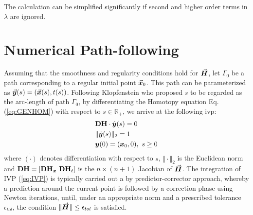 \begin{appendices}
The calculation can be simplified significantly if second and higher order 
terms in $\lambda$ are ignored.

\chapter{Numerical Path-following}\label{appendix:APPENDIX_E}

Assuming that the smoothness and regularity conditions hold for $\vec{\bm{H}}$, let
$\mathit{\Gamma}_0$ be a path corresponding to a regular initial point
$\vec{\bm{x}}_0$. This path can be parameterized as
$\vec{\bm{y}}(s)=(\vec{\bm{x}}(s),t(s))$. Following Klopfenstein\cite{Klopfenstein:1961}
who proposed $s$ to be regarded as the arc-length of path
$\mathit{\Gamma}_0$,
by differentiating the Homotopy equation Eq.
(\ref{eq:GENHOM})  with respect to $s\in\mathbb{R}_+$, we arrive at the 
following \acrshort{ivp}:
\begin{subequations}
	\begin{align}
		&\mathbf{DH}\cdot \dot{\bm{y}}(s) = 0\label{eq:IVP1_APP}\\
		&\Vert \dot{\bm{y}}(s)\Vert_2 = 1\label{eq:IVP2_AA}\\
		&\bm{y}(0) = (\bm{x}_0,0),\ s\geq 0\nonumber
	\end{align}
	\label{eq:IVP_APP}
\end{subequations}
\noindent where $\dot{(\cdot)}$ denotes differentiation with 
respect to $s$,  $\Vert \cdot\Vert_2$ is the Euclidean norm and
$\mathbf{DH}=[\mathbf{DH}_{\bm{x}}\ \mathbf{DH}_t]$ is the $n\times (n+1)$ 
Jacobian of $\vec{\bm{H}}$.
The integration of IVP (\ref{eq:IVP}) is typically carried out a by 
predictor-corrector approach, whereby a prediction around the current point 
is followed by a correction phase using Newton iterations, until, under an
appropriate norm and a prescribed tolerance $\epsilon_{tol}$, the condition
$\Vert \vec{\bm{H}}\Vert\leq \epsilon_{tol}$ is satisfied. 


\end{appendices}
